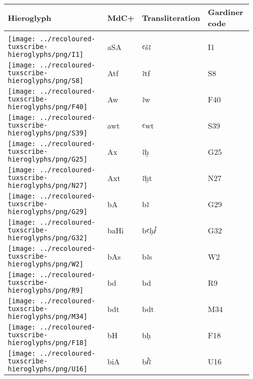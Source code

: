 \begin{center}
	\begin{tabularx}{\linewidth}{YYYY}
		Hieroglyph & MdC+ & Transliteration & Gardiner code\\
		\hline\\
		\texttt{[image: ../recoloured-tuxscribe-hieroglyphs/png/I1]} & aSA & ꜥšꜣ & I1 \\ 
		\texttt{[image: ../recoloured-tuxscribe-hieroglyphs/png/S8]} & Atf & ꜣtf & S8 \\ 
		\texttt{[image: ../recoloured-tuxscribe-hieroglyphs/png/F40]} & Aw & ꜣw & F40 \\ 
		\texttt{[image: ../recoloured-tuxscribe-hieroglyphs/png/S39]} & awt & ꜥwt & S39 \\ 
		\texttt{[image: ../recoloured-tuxscribe-hieroglyphs/png/G25]} & Ax & ꜣḫ & G25 \\ 
		\texttt{[image: ../recoloured-tuxscribe-hieroglyphs/png/N27]} & Axt & ꜣḫt & N27 \\ 
		\texttt{[image: ../recoloured-tuxscribe-hieroglyphs/png/G29]} & bA & bꜣ & G29 \\ 
		\texttt{[image: ../recoloured-tuxscribe-hieroglyphs/png/G32]} & baHi & bꜥḥꞽ & G32 \\ 
		\texttt{[image: ../recoloured-tuxscribe-hieroglyphs/png/W2]} & bAs & bꜣs & W2 \\ 
		\texttt{[image: ../recoloured-tuxscribe-hieroglyphs/png/R9]} & bd & bd & R9 \\ 
		\texttt{[image: ../recoloured-tuxscribe-hieroglyphs/png/M34]} & bdt & bdt & M34 \\ 
		\vspace{0.22500cm} \texttt{[image: ../recoloured-tuxscribe-hieroglyphs/png/F18]} \vspace{0.22500cm} & bH & bḥ & F18 \\ 
		\texttt{[image: ../recoloured-tuxscribe-hieroglyphs/png/U16]} & biA & bꞽꜣ & U16 \\ 
	\end{tabularx}
\end{center}


